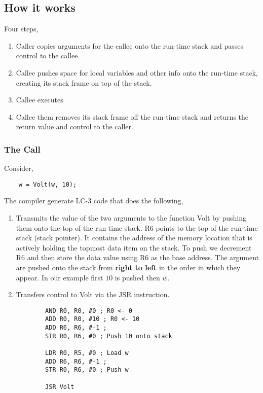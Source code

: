 \subsection{How it works}
Four steps,
\begin{enumerate}
    \item Caller copies arguments for the callee onto the run-time stack and passes control to the callee.
    \item Callee pushes space for local variables and other info onto the run-time stack, creating its stack frame on top of the stack.
    \item Callee executes
    \item Callee them removes its stack frame off the run-time stack and returns the return value and control to the caller. 
\end{enumerate}


\subsubsection{The Call}
Consider, 
\begin{verbatim}
    w = Volt(w, 10);
\end{verbatim}

The compiler generate LC-3 code that does the following, 

\begin{enumerate}
    \item Transmits the value of the two arguments to the function Volt by pushing them onto the top of the run-time stack. R6 points to the top of the run-time stack (stack pointer). It contains the address of the memory location that is actively holding the topmost data item on the stack. To push we decrement R6 and then store the data value using R6 as the base address. The argument are pushed onto the stack from \textbf{right to left} in the order in which they appear. In our example first $10$ is pushed then $w$.
    \item Transfers control to Volt via the JSR instruction.
        \begin{verbatim}
        AND R0, R0, #0 ; R0 <- 0
        ADD R0, R0, #10 ; R0 <- 10
        ADD R6, R6, #-1 ;
        STR R0, R6, #0 ; Push 10 onto stack

        LDR R0, R5, #0 ; Load w
        ADD R6, R6, #-1 ;
        STR R0, R6, #0 ; Push w

        JSR Volt
        \end{verbatim}
\end{enumerate}


